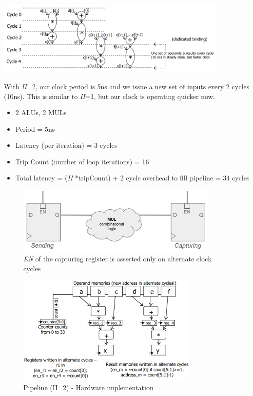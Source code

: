 \documentclass{article}
\begin{document}
\begin{minipage}[t]{0.6\textwidth}
    \vspace{0pt}
    \includegraphics[width=11.5cm, scale=1]{S2/pipeline_II2_schedule.PNG}
\end{minipage}%
\begin{minipage}[t]{0.4\textwidth}
    \vspace{0pt}
    With \textit{II}=2, our clock period is 5ns and we issue a new set of inputs every 2 cycles (10ns).
    This is similar to \textit{II}=1, but our clock is operating quicker now.

    \begin{itemize}
        \item 2 ALUs, 2 MULs
        \item Period = 5ns
        \item Latency (per iteration) = 3 cycles
        \item Trip Count (number of loop iterations) = 16
        \item Total latency = (\textit{II} *tripCount) + 2 cycle overhead to fill pipeline = 34 cycles
    \end{itemize}
\end{minipage}

\begin{figure}[htp]
    \centering
    \includegraphics[width=10cm, scale=1]{S2/multLogic.PNG}
    \caption{\textit{EN} of the capturing register is asserted only on alternate clock cycles}
\end{figure}

\newpage
\begin{figure}[htp]
    \centering
    \includegraphics[width=9cm, scale=1]{S2/pipeline_II2_hardware.PNG}
    \caption{Pipeline (II=2) - Hardware implementation}
\end{figure}
\end{document}

